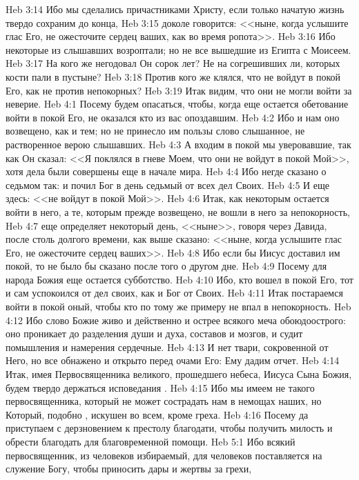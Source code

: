 \vs Heb 3:14 Ибо мы сделались причастниками Христу, если только начатую жизнь твердо сохраним до конца,
\vs Heb 3:15 доколе говорится: <<ныне, когда услышите глас Его, не ожесточите сердец ваших, как во время ропота>>.
\vs Heb 3:16 Ибо некоторые из слышавших возроптали; но не все вышедшие из Египта с Моисеем.
\vs Heb 3:17 На кого же негодовал Он сорок лет? Не на согрешивших ли, которых кости пали в пустыне?
\vs Heb 3:18 Против кого же клялся, что не войдут в покой Его, как не против непокорных?
\vs Heb 3:19 Итак видим, что они не могли войти за неверие.
\vs Heb 4:1 Посему будем опасаться, чтобы, когда еще остается обетование войти в покой Его, не оказался кто из вас опоздавшим.
\vs Heb 4:2 Ибо и нам оно возвещено, как и тем; но не принесло им пользы слово слышанное, не растворенное верою слышавших.
\vs Heb 4:3 А входим в покой мы уверовавшие, так как Он сказал: <<Я поклялся в гневе Моем, что они не войдут в покой Мой>>, хотя дела  были совершены еще в начале мира.
\vs Heb 4:4 Ибо негде сказано о седьмом  так: и почил Бог в день седьмый от всех дел Своих.
\vs Heb 4:5 И еще здесь: <<не войдут в покой Мой>>.
\vs Heb 4:6 Итак, как некоторым остается войти в него, а те, которым прежде возвещено, не вошли в него за непокорность,
\vs Heb 4:7  еще определяет некоторый день, <<ныне>>, говоря через Давида, после столь долгого времени, как выше сказано: <<ныне, когда услышите глас Его, не ожесточите сердец ваших>>.
\vs Heb 4:8 Ибо если бы Иисус  доставил им покой, то не было бы сказано после того о другом дне.
\vs Heb 4:9 Посему для народа Божия еще остается субботство.
\vs Heb 4:10 Ибо, кто вошел в покой Его, тот и сам успокоился от дел своих, как и Бог от Своих.
\rsbpar\vs Heb 4:11 Итак постараемся войти в покой оный, чтобы кто по тому же примеру не впал в непокорность.
\vs Heb 4:12 Ибо слово Божие живо и действенно и острее всякого меча обоюдоострого: оно проникает до разделения души и духа, составов и мозгов, и судит помышления и намерения сердечные.
\vs Heb 4:13 И нет твари, сокровенной от Него, но все обнажено и открыто перед очами Его: Ему дадим отчет.
\rsbpar\vs Heb 4:14 Итак, имея Первосвященника великого, прошедшего небеса, Иисуса Сына Божия, будем твердо держаться исповедания .
\vs Heb 4:15 Ибо мы имеем не такого первосвященника, который не может сострадать нам в немощах наших, но Который, подобно , искушен во всем, кроме греха.
\vs Heb 4:16 Посему да приступаем с дерзновением к престолу благодати, чтобы получить милость и обрести благодать для благовременной помощи.
\vs Heb 5:1 Ибо всякий первосвященник, из человеков избираемый, для человеков поставляется на служение Богу, чтобы приносить дары и жертвы за грехи,
